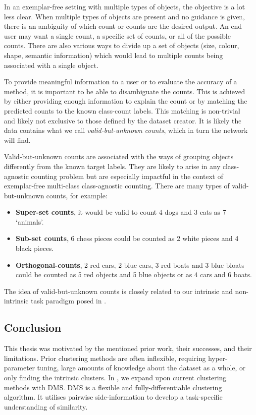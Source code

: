 \documentclass[../thesis.tex]{subfiles}
\begin{document}
In an exemplar-free setting with multiple types of objects, the objective is a lot less clear. 
When multiple types of objects are present and no guidance is given, there is an ambiguity of which count or counts are the desired output. 
An end user may want a single count, a specific set of counts, or all of the possible counts. 
There are also various ways to divide up a set of objects (size, colour, shape, semantic information) which would lead to multiple counts being associated with a single object.

To provide meaningful information to a user or to evaluate the accuracy of a method, it is important to be able to disambiguate the counts. This is achieved by either providing enough information to explain the count or by matching the predicted counts to the known class-count labels. This matching is non-trivial and likely not exclusive to those defined by the dataset creator. It is likely the data contains what we call \textit{valid-but-unknown counts}, which in turn the network will find.

Valid-but-unknown counts are associated with the ways of grouping objects differently from the known target labels.
They are likely to arise in any class-agnostic counting problem but are especially impactful in the context of  exemplar-free multi-class class-agnostic counting. 
There are many types of valid-but-unknown counts, for example: 
\begin{itemize}
    \item \textbf{Super-set counts}, it would be valid to count 4 dogs and 3 cats as 7 `animals'.
    \item \textbf{Sub-set counts}, 6 chess pieces could be counted as 2 white pieces and 4 black pieces.
    \item \textbf{Orthogonal-counts}, 2 red cars, 2 blue cars, 3 red boats and 3 blue bloats could be counted as 5 red objects and 5 blue objects or as 4 cars and 6 boats.
\end{itemize}

The idea of valid-but-unknown counts is closely related to our intrinsic and non-intrinsic task paradigm posed in .

\subsection{Conclusion}

This thesis was motivated by the mentioned prior work, their successes, and their limitations.
Prior clustering methods are often inflexible, requiring hyper-parameter tuning, large amounts of knowledge about the dataset as a whole, or only finding the intrinsic clusters.
In , we expand upon current clustering methods with DMS. 
DMS is a flexible and fully-differentiable clustering algorithm.
It utilises pairwise side-information to develop a task-specific understanding of similarity.
\end{document}
